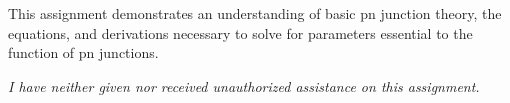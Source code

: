 \documentclass[12pt,letterpaper,titlepage]{article}
\begin{document}
\begin{raggedright}
This assignment demonstrates an understanding of basic pn junction theory, the equations, and derivations necessary to solve for parameters essential to the function of pn junctions.

\textit{I have neither given nor received unauthorized assistance on this assignment.}


\end{raggedright}
\end{document}
